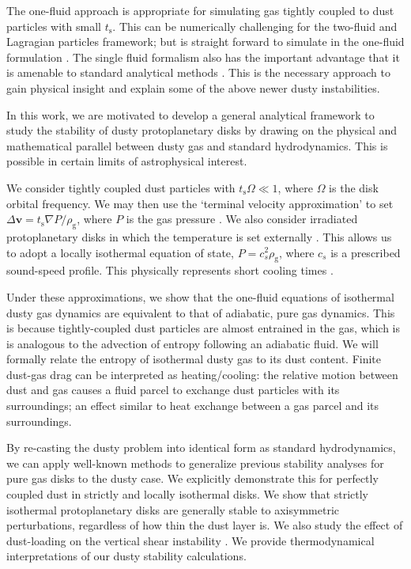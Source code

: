 \documentclass[iop, numberedappendix]{emulateapj}
\newcommand{\rhog}{\rho_\mathrm{g}}
\newcommand{\tstop}{t_\mathrm{s}}
\begin{document}
The one-fluid approach is appropriate for 
simulating gas tightly coupled to dust particles with small $\tstop$.  
This can be numerically challenging for the two-fluid and Lagragian
particles framework; but is straight forward to simulate in the
one-fluid formulation \citep{price15}.  The single fluid formalism
also has the important advantage that it is 
amenable to standard analytical methods
\citep{youdin05a,jacquet11}. This is the necessary  approach to gain
physical insight and explain some of the above newer dusty
instabilities. 

In this work, we are motivated to develop a general analytical
framework to  study the stability of dusty protoplanetary
disks by drawing on the physical and mathematical parallel between dusty gas and standard
hydrodynamics. This is possible in certain limits of astrophysical
interest.  

We consider tightly coupled dust particles with $\tstop\Omega\ll
1$, where $\Omega$ is the disk orbital frequency. We may then use the
`terminal velocity approximation' to set $\Delta \bm{v} = \tstop\nabla
P/\rhog$, where $P$ is the gas pressure \citep{youdin05a,
  jacquet11,laibe14}. %
 We also consider irradiated protoplanetary disks 
in which the temperature is set externally
\citep{chiang97,stam08}. This allows us to adopt a locally isothermal
equation of state, $P = c_s^2\rhog$, where $c_s$ is a prescribed
sound-speed profile. This physically represents short cooling times
\citep{lin15}.   

Under these approximations, we show that the one-fluid equations of 
isothermal dusty gas dynamics are equivalent to that of adiabatic, pure gas
dynamics. This is because tightly-coupled dust particles are almost
entrained in the gas, which is is analogous to the advection
of entropy following an adiabatic fluid. We will formally relate the 
entropy of isothermal dusty gas to its dust content. Finite  
dust-gas drag can be interpreted as heating/cooling: the relative
motion between dust and gas causes a fluid parcel to exchange dust
particles with its surroundings; an effect similar to heat exchange
between a gas parcel and its surroundings.   


By re-casting the dusty problem into identical form as standard  
hydrodynamics, we can apply well-known methods to generalize previous stability 
analyses for pure gas disks to the dusty case. We explicitly demonstrate this for
perfectly coupled dust in strictly and locally isothermal disks. We 
show that strictly isothermal protoplanetary disks are generally
stable to axisymmetric perturbations, regardless of how  thin the dust
layer is. We also study the effect of dust-loading on the vertical shear
instability \citep[VSI,][]{nelson13,lin15,barker15}. We provide 
thermodynamical interpretations of our dusty stability calculations. 
\end{document}
